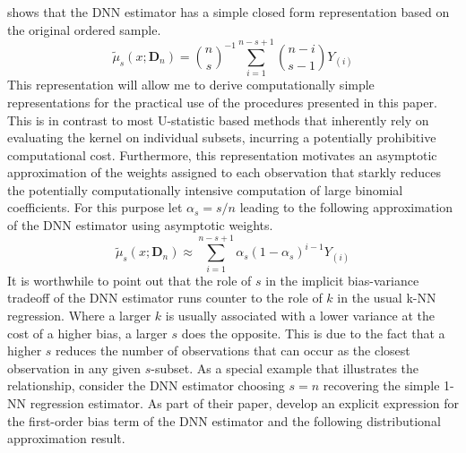 \citet{steele_exact_2009} shows that the DNN estimator has a simple closed form representation based on the original ordered sample.
\begin{equation}\label{eq:DNN_closed_form}
	\tilde{\mu}_{s}(x; \mathbf{D}_n)
	= \binom{n}{s}^{-1} \sum_{i = 1}^{n - s + 1}\binom{n - i}{s - 1}Y_{(i)}
\end{equation}
This representation will allow me to derive computationally simple representations for the practical use of the procedures presented in this paper.
This is in contrast to most U-statistic based methods that inherently rely on evaluating the kernel on individual subsets, incurring a potentially prohibitive computational cost.
Furthermore, this representation motivates an asymptotic approximation of the weights assigned to each observation that starkly reduces the potentially computationally intensive computation of large binomial coefficients.
For this purpose let $\alpha_{s} = s/n$ leading to the following approximation of the DNN estimator using asymptotic weights.
\begin{equation}\label{eq:DNN_approx_closed_form}
	\tilde{\mu}_{s}(x; \mathbf{D}_n)
	\approx  \sum_{i = 1}^{n - s + 1} \alpha_{s} \left(1 - \alpha_{s}\right)^{i - 1} Y_{(i)}
\end{equation}
It is worthwhile to point out that the role of $s$ in the implicit bias-variance tradeoff of the DNN estimator runs counter to the role of $k$ in the usual k-NN regression.
Where a larger $k$ is usually associated with a lower variance at the cost of a higher bias, a larger $s$ does the opposite.
This is due to the fact that a higher $s$ reduces the number of observations that can occur as the closest observation in any given $s$-subset.
As a special example that illustrates the relationship, consider the DNN estimator choosing $s = n$ recovering the simple 1-NN regression estimator.
As part of their paper, \citet{demirkaya_optimal_2024} develop an explicit expression for the first-order bias term of the DNN estimator and the following distributional approximation result.
